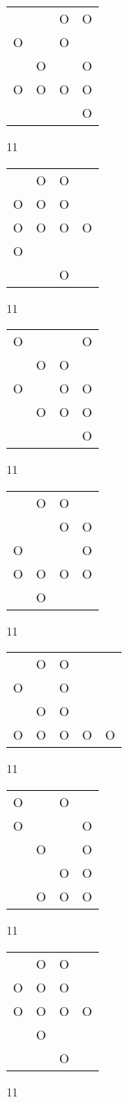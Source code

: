 \begin{tabular}{|m{0.2cm}m{0.2cm}m{0.2cm}m{0.2cm}|}\hline
 & &O&O\\
O& &O& \\
 &O& &O\\
O&O&O&O\\
 & & &O\\
\hline\end{tabular}11
\begin{tabular}{|m{0.2cm}m{0.2cm}m{0.2cm}m{0.2cm}|}\hline
 &O&O& \\
O&O&O& \\
O&O&O&O\\
O& & & \\
 & &O& \\
\hline\end{tabular}11
\begin{tabular}{|m{0.2cm}m{0.2cm}m{0.2cm}m{0.2cm}|}\hline
O& & &O\\
 &O&O& \\
O& &O&O\\
 &O&O&O\\
 & & &O\\
\hline\end{tabular}11
\begin{tabular}{|m{0.2cm}m{0.2cm}m{0.2cm}m{0.2cm}|}\hline
 &O&O& \\
 & &O&O\\
O& & &O\\
O&O&O&O\\
 &O& & \\
\hline\end{tabular}11
\begin{tabular}{|m{0.2cm}m{0.2cm}m{0.2cm}m{0.2cm}m{0.2cm}|}\hline
 &O&O& & \\
O& &O& & \\
 &O&O& & \\
O&O&O&O&O\\
\hline\end{tabular}11
\begin{tabular}{|m{0.2cm}m{0.2cm}m{0.2cm}m{0.2cm}|}\hline
O& &O& \\
O& & &O\\
 &O& &O\\
 & &O&O\\
 &O&O&O\\
\hline\end{tabular}11
\begin{tabular}{|m{0.2cm}m{0.2cm}m{0.2cm}m{0.2cm}|}\hline
 &O&O& \\
O&O&O& \\
O&O&O&O\\
 &O& & \\
 & &O& \\
\hline\end{tabular}11
